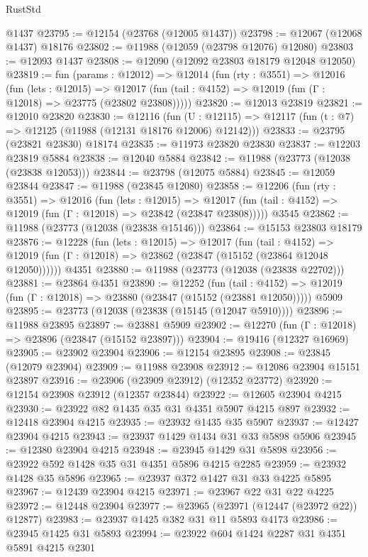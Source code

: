 \begin{lexlean}{RustStd}
\begin{coremodule}
    @1437
@23795 := @12154 (@23768 (@12005 @1437))
@23798 := @12067 (@12068 @1437) @18176
@23802 := @11988 (@12059 (@23798 @12076) @12080)
@23803 := @12093 @1437
@23808 := @12090 (@12092 @23803 @18179 @12048 @12050)
@23819 := fun (params : @12012) =>
  @12014
    (fun (rty : @3551) =>
    @12016
      (fun (lets : @12015) =>
      @12017 (fun (tail : @4152) => @12019 (fun (Γ : @12018) => @23775 (@23802 @23808)))))
@23820 := @12013 @23819
@23821 := @12010 @23820
@23830 := @12116
    (fun (U : @12115) => @12117 (fun (t : @7) => @12125 (@11988 (@12131 @18176 @12006) @12142)))
@23833 := @23795 (@23821 @23830) @18174
@23835 := @11973 @23820 @23830
@23837 := @12203 @23819 @5884
@23838 := @12040 @5884
@23842 := @11988 (@23773 (@12038 (@23838 @12053)))
@23844 := @23798 (@12075 @5884)
@23845 := @12059 @23844
@23847 := @11988 (@23845 @12080)
@23858 := @12206
    (fun (rty : @3551) =>
    @12016
      (fun (lets : @12015) =>
      @12017 (fun (tail : @4152) => @12019 (fun (Γ : @12018) => @23842 (@23847 @23808)))))
    @3545
@23862 := @11988 (@23773 (@12038 (@23838 @15146)))
@23864 := @15153 @23803 @18179
@23876 := @12228
    (fun (lets : @12015) =>
    @12017
      (fun (tail : @4152) =>
      @12019 (fun (Γ : @12018) => @23862 (@23847 (@15152 (@23864 @12048 @12050))))))
    @4351
@23880 := @11988 (@23773 (@12038 (@23838 @22702)))
@23881 := @23864 @4351
@23890 := @12252
    (fun (tail : @4152) => @12019 (fun (Γ : @12018) => @23880 (@23847 (@15152 (@23881 @12050)))))
    @5909
@23895 := @23773 (@12038 (@23838 (@15145 (@12047 @5910))))
@23896 := @11988 @23895
@23897 := @23881 @5909
@23902 := @12270 (fun (Γ : @12018) => @23896 (@23847 (@15152 @23897)))
@23904 := @19416 (@12327 @16969)
@23905 := @23902 @23904
@23906 := @12154 @23895
@23908 := @23845 (@12079 @23904)
@23909 := @11988 @23908
@23912 := @12086 @23904 @15151 @23897
@23916 := @23906 (@23909 @23912) (@12352 @23772)
@23920 := @12154 @23908 @23912 (@12357 @23844)
@23922 := @12605 @23904 @4215
@23930 := @23922 @82 @1435 @35 @31 @4351 @5907 @4215 @897
@23932 := @12418 @23904 @4215
@23935 := @23932 @1435 @35 @5907
@23937 := @12427 @23904 @4215
@23943 := @23937 @1429 @1434 @31 @33 @5898 @5906
@23945 := @12380 @23904 @4215
@23948 := @23945 @1429 @31 @5898
@23956 := @23922 @592 @1428 @35 @31 @4351 @5896 @4215 @2285
@23959 := @23932 @1428 @35 @5896
@23965 := @23937 @372 @1427 @31 @33 @4225 @5895
@23967 := @12439 @23904 @4215
@23971 := @23967 @22 @31 @22 @4225
@23972 := @12448 @23904
@23977 := @23965 (@23971 (@12447 (@23972 @22)) @12877)
@23983 := @23937 @1425 @382 @31 @11 @5893 @4173
@23986 := @23945 @1425 @31 @5893
@23994 := @23922 @604 @1424 @2287 @31 @4351 @5891 @4215 @2301

\end{coremodule}
\end{lexlean}
